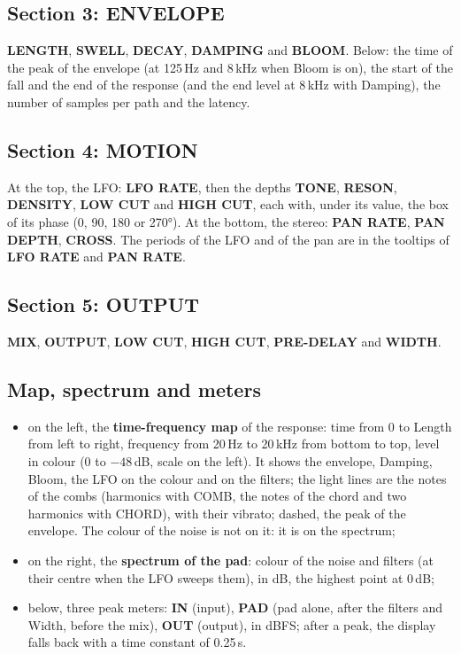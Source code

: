 \documentclass[a4paper,11pt]{article}
\newcommand{\ctl}[1]{\textsf{\textbf{#1}}}   %
\newcommand{\dB}{\,dB}
\begin{document}
\subsection{Section 3: ENVELOPE}
\ctl{LENGTH}, \ctl{SWELL}, \ctl{DECAY}, \ctl{DAMPING} and \ctl{BLOOM}. Below: the time of the peak of
the envelope (at 125\,Hz and 8\,kHz when Bloom is on), the start of the fall and the end of the
response (and the end level at 8\,kHz with Damping), the number of samples per path and the latency.

\subsection{Section 4: MOTION}
At the top, the LFO: \ctl{LFO RATE}, then the depths \ctl{TONE}, \ctl{RESON}, \ctl{DENSITY},
\ctl{LOW CUT} and \ctl{HIGH CUT}, each with, under its value, the box of its phase (0, 90, 180 or
270°). At the bottom, the stereo: \ctl{PAN RATE}, \ctl{PAN DEPTH}, \ctl{CROSS}. The periods of the
LFO and of the pan are in the tooltips of \ctl{LFO RATE} and \ctl{PAN RATE}.

\subsection{Section 5: OUTPUT}
\ctl{MIX}, \ctl{OUTPUT}, \ctl{LOW CUT}, \ctl{HIGH CUT}, \ctl{PRE-DELAY} and \ctl{WIDTH}.

\subsection{Map, spectrum and meters}
\begin{itemize}
\item on the left, the \textbf{time-frequency map} of the response: time from 0 to Length from
  left to right, frequency from 20\,Hz to 20\,kHz from bottom to top, level in colour (0 to
  $-48$\dB, scale on the left). It shows the envelope, Damping, Bloom, the LFO on the colour and on the
  filters; the light lines are the notes of the combs (harmonics with COMB, the notes of the chord
  and two harmonics with CHORD), with their vibrato; dashed, the peak of the envelope. The colour
  of the noise is not on it: it is on the spectrum;
\item on the right, the \textbf{spectrum of the pad}: colour of the noise and filters (at their
  centre when the LFO sweeps them), in dB, the highest point at 0\dB;
\item below, three peak meters: \ctl{IN} (input), \ctl{PAD} (pad alone, after the filters and
  Width, before the mix), \ctl{OUT} (output), in dBFS; after a peak, the display falls back with a
  time constant of 0.25\,s.
\end{itemize}
\end{document}
